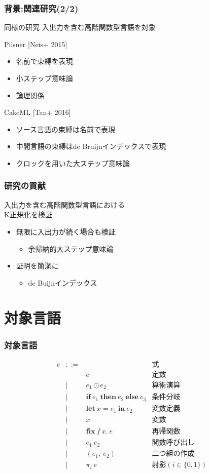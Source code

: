 \documentclass[dvipdfmx,cjk,xcolor=dvipsnames,envcountsect,notheorems,12pt]{beamer}
\theoremstyle{definition}
\newcommand{\keyword}[1]{\mathbf{#1}}
\newcommand{\LET}{\keyword{let}}
\newcommand{\IF}{\keyword{if}}
\newcommand{\THEN}{\keyword{then}}
\newcommand{\ELSE}{\keyword{else}}
\newcommand{\FIX}{\keyword{fix}}
\newcommand{\IN}{\keyword{in}}
\begin{document}
\begin{frame}
	\frametitle{背景:関連研究(2/2)}
	\LARGE
	同様の研究
	入出力を含む高階関数型言語を対象

	\vfill

	Pilsner [Neis+ 2015]
	\begin{itemize}
		\item 名前で束縛を表現
		\item 小ステップ意味論
		\item 論理関係
	\end{itemize}

	CakeML [Tan+ 2016]
	\begin{itemize}
		\item ソース言語の束縛は名前で表現
		\item 中間言語の束縛はde Bruijnインデックスで表現
		\item クロックを用いた大ステップ意味論
	\end{itemize}
\end{frame}

\begin{frame}
	\frametitle{研究の貢献}
	\LARGE 入出力を含む高階関数型言語における\\
	K正規化を検証
	\begin{itemize}
		\item 無限に入出力が続く場合も検証
			\begin{itemize}
				\item 余帰納的大ステップ意味論
			\end{itemize}
		\item 証明を簡潔に
			\begin{itemize}
				\item de Buijnインデックス
			\end{itemize}
	\end{itemize}
\end{frame}

\section{対象言語}

\begin{frame}
	\frametitle{対象言語}
	{\normalsize
	\[ \begin{array}{lcll}
		e & ::= & & \mbox{式} \\
				& & c	& \mbox{定数} \\
				& | & e_1 \odot e_2 & \mbox{算術演算} \\
				& | & \IF~e_1~\THEN~e_2~\ELSE~e_3 & \mbox{条件分岐} \\
				& | & \LET~x=e_1~\IN~e_2 & \mbox{変数定義} \\
				& | & x & \mbox{変数} \\
				& | & \FIX~f~x.~e & \mbox{再帰関数} \\
				& | & e_1~e_2 & \mbox{関数呼び出し} \\
				& | & (e_1,~e_2) & \mbox{二つ組の作成} \\
				& | & \pi_i~e & \mbox{射影}(i \in \{0, 1\}) \\
	\end{array} \]}
\end{frame}
\end{document}

